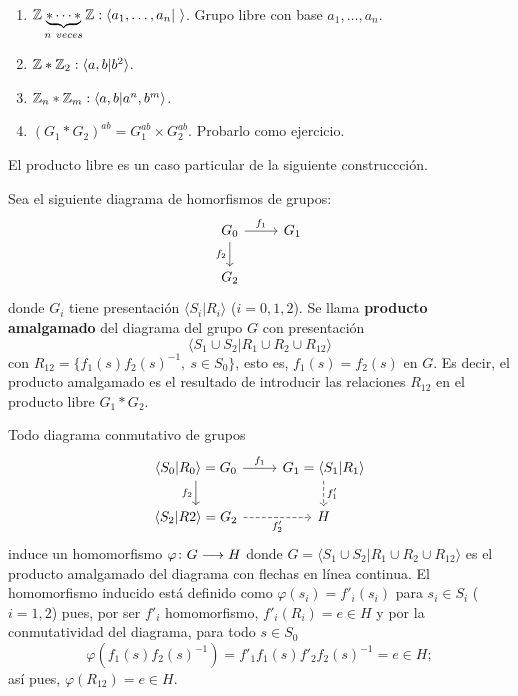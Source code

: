 \documentclass[GTS.tex]{subfiles}
\begin{document}
\begin{ej}\
\begin{enumerate}
\item $\mathbb{Z}\underbrace{*\cdots *}_{n\ veces}\mathbb{Z}: \langle a_1,\dots,a_n|\ \rangle$. Grupo libre con base $a_1,\dots,a_n$.
\item $\mathbb{Z}*\mathbb{Z}_2: \langle a,b|b^2\rangle$.
\item $\mathbb{Z}_n*\mathbb{Z}_m: \langle a,b| a^n,b^m\rangle$.
\item $(G_1*G_2)^{ab}=G_1^{ab}\times G_2^{ab}$. Probarlo como ejercicio.
\end{enumerate}
\end{ej}

El producto libre es un caso particular de la siguiente construccción.  

\begin{defi}
Sea el siguiente diagrama de homorfismos de grupos:
\[
\begin{tikzcd}
G_0 \ar[r, "f_1"]\arrow[d,"f_2 "'] & G_1\\
G_2
\end{tikzcd}
\]
donde $G_i$ tiene presentación $\langle S_i|R_i\rangle$ ($i=0,1,2$). Se llama \textbf{producto amalgamado} del diagrama del grupo $G$ con presentación
\[
\langle S_1\cup S_2 | R_1\cup R_2\cup R_{12}\rangle
\]
con $R_{12}=\{f^{}_1(s)f^{}_2(s)^{-1},\ s\in S_0\}$, esto es, $f_1(s)=f_2(s)$ en $G$. Es decir, el producto amalgamado es el resultado de introducir las relaciones $R_{12}$ en el producto libre $G_1*G_2$.
\end{defi}

\begin{nota}[Importante] Todo diagrama conmutativo de grupos
\[
\begin{tikzcd}
\langle S_0|R_0\rangle =G_0 \ar[r, "f_1"]\arrow[d,"f_2 "'] & G_1=\langle S_1|R_1\rangle\ar[d,dashed,"f'_1"]\\
\langle S_2|R2 \rangle =G_2\ar[r, dashed, "f'_2"'] & H
\end{tikzcd}
\]
induce un homomorfismo $\varphi\colon{G}\longrightarrow{H}$ donde $G=\langle S_1\cup S_2 | R_1\cup R_2\cup R_{12}\rangle$ es el producto amalgamado del diagrama con flechas en línea continua. El homomorfismo inducido está definido como $\varphi(s_i)=f'_i(s_i)$ para $s_i\in S_i$ ($i=1,2$) pues, por ser $f'_i$ homomorfismo, $f'_i(R_i)=e\in H$ y por la conmutatividad del diagrama, para todo $s\in S_0$
\[
\varphi(f_1(s)f_2(s)^{-1})=f'_1f_1^{}(s)f'_2f_2^{}(s)^{-1}=e\in H;
\]
así pues, $\varphi(R_{12})=e\in H$.
\end{nota}
\end{document}

